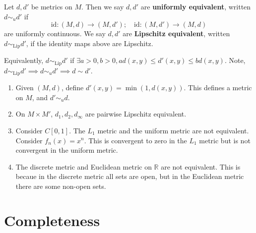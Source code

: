 \documentclass[a4paper]{article}
\begin{document}
\begin{definition}
	Let \( d, d' \) be metrics on \( M \).
	Then we say \( d, d' \) are \textbf{uniformly equivalent}, written \( d \sim_u d' \) if
	\[
		\mathrm{id} \colon (M, d) \to (M, d');\quad \mathrm{id} \colon (M, d') \to (M, d)
	\]
	are uniformly continuous.
	We say \( d, d' \) are \textbf{Lipschitz equivalent}, written \( d \sim_\mathrm{Lip} d' \), if the identity maps above are Lipschitz.
\end{definition}
Equivalently, \( d \sim_\mathrm{Lip} d' \) if \( \exists a > 0, b > 0, ad(x,y) \leq d'(x,y) \leq bd(x,y) \).
	Note, \( d \sim_\mathrm{Lip} d' \implies d \sim_u d' \implies d \sim d' \).
\begin{example}
	\begin{enumerate}
        \item Given \( (M,d) \), define \( d'(x,y) = \min(1,d(x,y)) \).
        This defines a metric on \( M \), and \( d' \sim_u d \).
    
        \item On \( M \times M' \), \( d_1, d_2, d_\infty \) are pairwise Lipschitz equivalent.
    
        \item Consider \( C[0,1] \).
        The \( L_1 \) metric and the uniform metric are not equivalent.
        Consider \( f_n(x) = x^n \).
        This is convergent to zero in the \( L_1 \) metric but is not convergent in the uniform metric.
    
        \item The discrete metric and Euclidean metric on \( \mathbb R \) are not equivalent.
        This is becaue in the discrete metric all sets are open, but in the Euclidean metric there are some non-open sets.
    \end{enumerate}
\end{example}

\section{Completeness}
\end{document}
